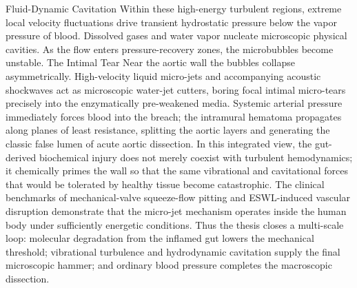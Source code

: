 Fluid-Dynamic Cavitation
Within these high-energy turbulent regions, extreme local velocity fluctuations drive transient hydrostatic pressure below the vapor pressure of blood. Dissolved gases and water vapor nucleate microscopic physical cavities. As the flow enters pressure-recovery zones, the microbubbles become unstable.
The Intimal Tear
Near the aortic wall the bubbles collapse asymmetrically. High-velocity liquid micro-jets and accompanying acoustic shockwaves act as microscopic water-jet cutters, boring focal intimal micro-tears precisely into the enzymatically pre-weakened media. Systemic arterial pressure immediately forces blood into the breach; the intramural hematoma propagates along planes of least resistance, splitting the aortic layers and generating the classic false lumen of acute aortic dissection.
In this integrated view, the gut-derived biochemical injury does not merely coexist with turbulent hemodynamics; it chemically primes the wall so that the same vibrational and cavitational forces that would be tolerated by healthy tissue become catastrophic. The clinical benchmarks of mechanical-valve squeeze-flow pitting and ESWL-induced vascular disruption demonstrate that the micro-jet mechanism operates inside the human body under sufficiently energetic conditions. Thus the thesis closes a multi-scale loop: molecular degradation from the inflamed gut lowers the mechanical threshold; vibrational turbulence and hydrodynamic cavitation supply the final microscopic hammer; and ordinary blood pressure completes the macroscopic dissection.

